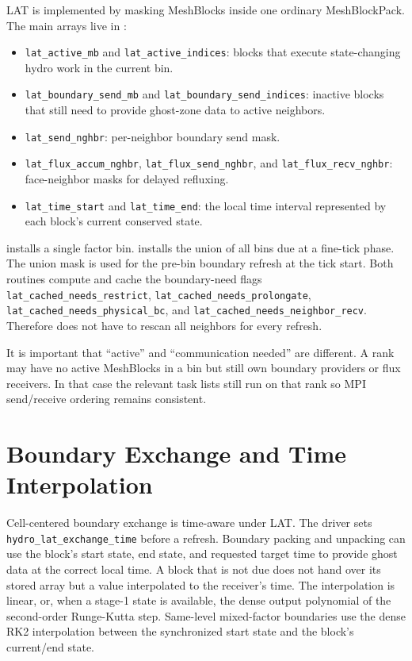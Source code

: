 \documentclass[11pt]{article}
\begin{document}
LAT is implemented by masking MeshBlocks inside one ordinary MeshBlockPack.
The main arrays live in :
\begin{itemize}
  \item \texttt{lat\_active\_mb} and \texttt{lat\_active\_indices}: blocks that
        execute state-changing hydro work in the current bin.
  \item \texttt{lat\_boundary\_send\_mb} and
        \texttt{lat\_boundary\_send\_indices}: inactive blocks that still need
        to provide ghost-zone data to active neighbors.
  \item \texttt{lat\_send\_nghbr}: per-neighbor boundary send mask.
  \item \texttt{lat\_flux\_accum\_nghbr},
        \texttt{lat\_flux\_send\_nghbr}, and
        \texttt{lat\_flux\_recv\_nghbr}: face-neighbor masks for delayed
        refluxing.
  \item \texttt{lat\_time\_start} and \texttt{lat\_time\_end}: the local time
        interval represented by each block's current conserved state.
\end{itemize}

 installs a single factor bin.
 installs the union of all bins due at
a fine-tick phase.  The union mask is used for the pre-bin boundary refresh at
the tick start.  Both routines compute and cache the boundary-need flags
\texttt{lat\_cached\_needs\_restrict},
\texttt{lat\_cached\_needs\_prolongate},
\texttt{lat\_cached\_needs\_physical\_bc}, and
\texttt{lat\_cached\_needs\_neighbor\_recv}.  Therefore
 does not have to rescan all neighbors for
every refresh.

It is important that ``active'' and ``communication needed'' are different.
A rank may have no active MeshBlocks in a bin but still own boundary providers
or flux receivers.  In that case the relevant task lists still run on that
rank so MPI send/receive ordering remains consistent.

\section{Boundary Exchange and Time Interpolation}
\label{sec:boundary}

Cell-centered boundary exchange is time-aware under LAT.  The driver sets
\texttt{hydro\_lat\_exchange\_time} before a refresh.  Boundary packing and
unpacking can use the block's start state, end state, and requested target time
to provide ghost data at the correct local time.  A block that is not due does
not hand over its stored array but a value interpolated to the receiver's time.
The interpolation is linear, or, when a stage-1 state is available, the dense
output polynomial of the second-order Runge-Kutta step.  Same-level
mixed-factor boundaries use the dense RK2 interpolation between the
synchronized start state and the block's current/end state.
\end{document}
